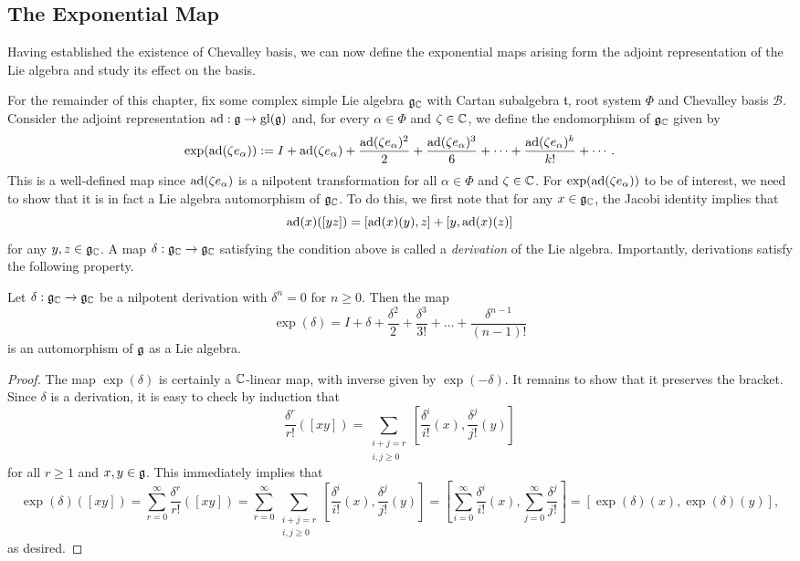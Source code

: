 \subsection{The Exponential Map}
Having established the existence of Chevalley basis, we can now define the exponential maps arising form the adjoint representation of the Lie algebra and study its effect on the basis. 

For the remainder of this chapter, fix some complex simple Lie algebra $\mathfrak{g}_{\mathbb{C}}$ with Cartan subalgebra $\mathfrak{t}$, root system $\Phi$ and Chevalley basis $\mathcal{B}$. Consider the adjoint representation $\mathrm{ad}:\mathfrak{g}\to\mathrm{gl}(\mathfrak{g})$ and, for every $\alpha\in\Phi$ and $\zeta\in\mathbb{C}$, we define the endomorphism of $\mathfrak{g}_{\mathbb{C}}$ given by
$$\exp(\mathrm{ad}(\zeta e_\alpha)):=I+\mathrm{ad}(\zeta e_\alpha)+\frac{\mathrm{ad}(\zeta e_\alpha)^2}{2}+\frac{\mathrm{ad}(\zeta e_\alpha)^3}{6}+\cdots+\frac{\mathrm{ad}(\zeta e_\alpha)^k}{k!}+\cdots.$$
This is a well-defined map since $\mathrm{ad}(\zeta e_\alpha)$ is a nilpotent transformation for all $\alpha\in\Phi$ and $\zeta\in\mathbb{C}$. For $\exp(\mathrm{ad}(\zeta e_\alpha))$ to be of interest, we need to show that it is in fact a Lie algebra automorphism of $\mathfrak{g}_{\mathbb{C}}$. To do this, we first note that for any $x\in\mathfrak{g}_{\mathbb{C}}$, the Jacobi identity implies that
$$\mathrm{ad}(x)([yz])=[\mathrm{ad}(x)(y),z]+[y,\mathrm{ad}(x)(z)]$$
for any $y,z\in\mathfrak{g}_{\mathbb{C}}$. A map $\delta:\mathfrak{g}_{\mathbb{C}}\to\mathfrak{g}_{\mathbb{C}}$ satisfying the condition above is called a \textit{derivation} of the Lie algebra. Importantly, derivations satisfy the following property.

\begin{proposition}
    Let $\delta:\mathfrak{g}_{\mathbb{C}}\to\mathfrak{g}_{\mathbb{C}}$ be a nilpotent derivation with $\delta^n=0$ for $n\geq 0$. Then the map $$\exp(\delta)=I+\delta+\frac{\delta^2}{2}+\frac{\delta^3}{3!}+\dots+\frac{\delta^{n-1}}{(n-1)!}$$
    is an automorphism of $\mathfrak{g}$ as a Lie algebra.
\end{proposition}
\begin{proof}
    The map $\exp(\delta)$ is certainly a $\mathbb{C}$-linear map, with inverse given by $\exp(-\delta)$. It remains to show that it preserves the bracket. Since $\delta$ is a derivation, it is easy to check by induction that 
    $$\frac{\delta^r}{r!}([xy])=\sum_{\substack{i+j=r \\ i,j\geq 0}}\left[\frac{\delta^i}{i!}(x),\frac{\delta^{j}}{j!}(y)\right]$$ 
    for all $r\geq 1$ and $x,y\in\mathfrak{g}$. This immediately implies that
    $$\exp(\delta)([xy])=\sum_{r=0}^{\infty}\frac{\delta^r}{r!}([xy])=\sum_{r=0}^{\infty}\sum_{\substack{i+j=r \\ i,j\geq 0}}\left[\frac{\delta^i}{i!}(x),\frac{\delta^{j}}{j!}(y)\right]=\left[\sum_{i=0}^\infty\frac{\delta^i}{i!}(x),\sum_{j=0}^{\infty}\frac{\delta^j}{j!}\right]=[\exp(\delta)(x),\exp(\delta)(y)],$$
    as desired.
\end{proof}

